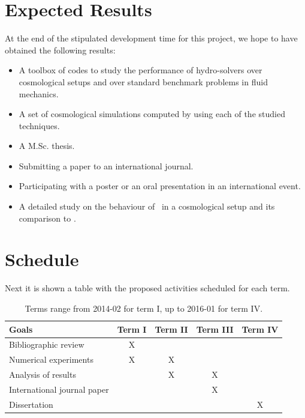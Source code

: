 \documentclass[a4,useAMS,usenatbib,usegraphicx,12pt]{article}
\begin{document}
\section{Expected Results}
At the end of the stipulated development time for this project, we hope to have
obtained the following results:
\begin{itemize}
\item A toolbox of codes to study the performance of hydro-solvers over 
cosmological setups and over standard benchmark problems in fluid mechanics.
\item A set of cosmological simulations computed by using each of the studied
techniques.
\item A M.Sc. thesis.
\item Submitting a paper to an international journal.
\item Participating with a poster or an oral presentation in an international
event.
\item A detailed study on the behaviour of \VPH\ in a cosmological setup and 
its comparison to \SPH.
\end{itemize}


\section{Schedule}
Next it is shown a table with the proposed activities scheduled for each term.

\begin{table}[h]
\begin{flushleft}
\begin{center}
  \begin{tabular}{l  c c c c } \hline\hline
	\centering\textbf{Goals} & \textbf{Term I} & \textbf{Term II} & 
	\textbf{Term III} & \textbf{Term IV} \\ \hline\hline
	
	 Bibliographic review & X & & & \\
	 Numerical experiments & X & X & & \\
	 Analysis of results &  & X & X & \\
	 International journal paper &  &  & X & \\
	 Dissertation &  &  &  & X \\
	\hline\hline
  \end{tabular}  
  \caption{ Terms range from 2014-02 for term I, up to 2016-01 for term IV.}
\end{center}
\end{flushleft}
\end{table}



\renewcommand{\bibname}{11\ \ \ \ Bibliography}
\small

\end{document}
